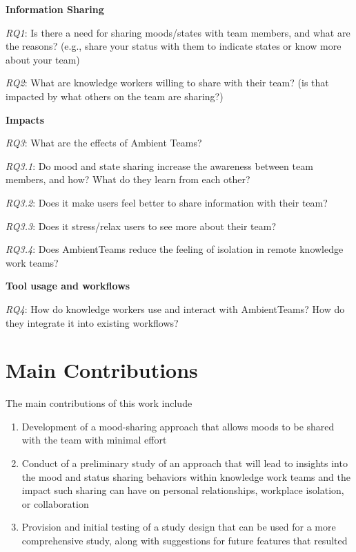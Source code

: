 \medskip\noindent\textbf{Information Sharing}

\smallskip\noindent\textit{RQ1}: Is there a need for sharing moods/states with team members, and what are the reasons? (e.g., share your status with them to indicate states or know more about your team)

\smallskip\noindent\textit{RQ2}: What are knowledge workers willing to share with their team? (is that impacted by what others on the team are sharing?)

\medskip\noindent\textbf{Impacts}

\smallskip\noindent\textit{RQ3}: What are the effects of Ambient Teams?

\setlength{\leftskip}{0.5cm}
\smallskip\noindent\textit{RQ3.1}: Do mood and state sharing increase the awareness between team members, and how? What do they learn from each other?

\smallskip\noindent\textit{RQ3.2}: Does it make users feel better to share information with their team?

\smallskip\noindent\textit{RQ3.3}: Does it stress/relax users to see more about their team?

\smallskip\noindent\textit{RQ3.4}: Does AmbientTeams reduce the feeling of isolation in remote knowledge work teams?

\setlength{\leftskip}{0pt}

\medskip\noindent\textbf{Tool usage and workflows}

\smallskip\noindent\textit{RQ4}: How do knowledge workers use and interact with AmbientTeams? How do they integrate it into existing workflows?

\section{Main Contributions}
The main contributions of this work include
\begin{enumerate}
    \item Development of a mood-sharing approach that allows moods to be shared with the team with minimal effort
    \item Conduct of a preliminary study of an approach that will lead to insights into the mood and status sharing behaviors within knowledge work teams and the impact such sharing can have on personal relationships, workplace isolation, or collaboration
    \item Provision and initial testing of a study design that can be used for a more comprehensive study, along with suggestions for future features that resulted
\end{enumerate}
